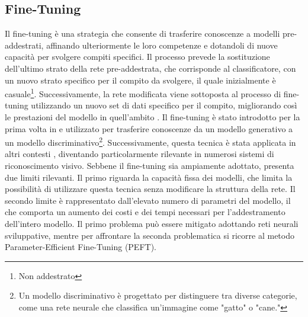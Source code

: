 \subsection{Fine-Tuning}
Il fine-tuning è una strategia che consente di trasferire conoscenze a modelli pre-addestrati, affinando ulteriormente le loro competenze e dotandoli di nuove capacità per svolgere compiti specifici. Il processo prevede la sostituzione dell'ultimo strato della rete pre-addestrata, che corrisponde al classificatore, con un nuovo strato specifico per il compito da svolgere, il quale inizialmente è casuale\footnote{Non addestrato}. Successivamente, la rete modificata viene sottoposta al processo di fine-tuning utilizzando un nuovo set di dati specifico per il compito, migliorando così le prestazioni del modello in quell'ambito \cite{DBLP:journals/corr/abs-1907-07844}.
Il fine-tuning è stato introdotto per la prima volta in \cite{hinton2006reducing} e utilizzato per trasferire conoscenze da un modello generativo a un modello discriminativo\footnote{Un modello discriminativo è progettato per distinguere tra diverse categorie, come una rete neurale che classifica un'immagine come "gatto" o "cane."}. Successivamente, questa tecnica è stata applicata in altri contesti \cite{zeiler2014visualizing} \cite{girshick2014rich}, diventando particolarmente rilevante in numerosi sistemi di riconoscimento visivo.
Sebbene il fine-tuning sia ampiamente adottato, presenta due limiti rilevanti. Il primo riguarda la capacità fissa dei modelli, che limita la possibilità di utilizzare questa tecnica senza modificare la struttura della rete. Il secondo limite è rappresentato dall'elevato numero di parametri del modello, il che comporta un aumento dei costi e dei tempi necessari per l'addestramento dell'intero modello. Il primo problema può essere mitigato adottando reti neurali sviluppative, mentre per affrontare la seconda problematica si ricorre al metodo Parameter-Efficient Fine-Tuning (PEFT).

